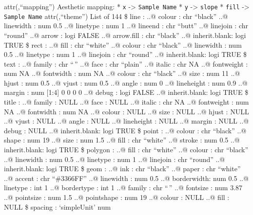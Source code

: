 \documentclass[
]{article}
\begin{document}
attr(,``mapping'') Aesthetic mapping: * \texttt{x} -\textgreater{}
\texttt{Sample\ Name} * \texttt{y} -\textgreater{} \texttt{slope} *
\texttt{fill} -\textgreater{} \texttt{Sample\ Name} attr(,``theme'')
List of 144 \$ line : ..@ colour : chr ``black'' ..@ linewidth : num 0.5
..@ linetype : num 1 ..@ lineend : chr ``butt'' ..@ linejoin : chr
``round'' ..@ arrow : logi FALSE ..@ arrow.fill : chr ``black'' ..@
inherit.blank: logi TRUE \$ rect : ..@ fill : chr ``white'' ..@ colour :
chr ``black'' ..@ linewidth : num 0.5 ..@ linetype : num 1 ..@ linejoin
: chr ``round'' ..@ inherit.blank: logi TRUE \$ text : ..@ family : chr
``\,'' ..@ face : chr ``plain'' ..@ italic : chr NA ..@ fontweight : num
NA ..@ fontwidth : num NA ..@ colour : chr ``black'' ..@ size : num 11
..@ hjust : num 0.5 ..@ vjust : num 0.5 ..@ angle : num 0 ..@ lineheight
: num 0.9 ..@ margin : num {[}1:4{]} 0 0 0 0 ..@ debug : logi FALSE ..@
inherit.blank: logi TRUE \$ title : ..@ family : NULL ..@ face : NULL
..@ italic : chr NA ..@ fontweight : num NA ..@ fontwidth : num NA ..@
colour : NULL ..@ size : NULL ..@ hjust : NULL ..@ vjust : NULL ..@
angle : NULL ..@ lineheight : NULL ..@ margin : NULL ..@ debug : NULL
..@ inherit.blank: logi TRUE \$ point : ..@ colour : chr ``black'' ..@
shape : num 19 ..@ size : num 1.5 ..@ fill : chr ``white'' ..@ stroke :
num 0.5 ..@ inherit.blank: logi TRUE \$ polygon : ..@ fill : chr
``white'' ..@ colour : chr ``black'' ..@ linewidth : num 0.5 ..@
linetype : num 1 ..@ linejoin : chr ``round'' ..@ inherit.blank: logi
TRUE \$ geom : ..@ ink : chr ``black'' ..@ paper : chr ``white'' ..@
accent : chr ``\#3366FF'' ..@ linewidth : num 0.5 ..@ borderwidth: num
0.5 ..@ linetype : int 1 ..@ bordertype : int 1 ..@ family : chr ``\,''
..@ fontsize : num 3.87 ..@ pointsize : num 1.5 ..@ pointshape : num 19
..@ colour : NULL ..@ fill : NULL \$ spacing : `simpleUnit' num
\end{document}
